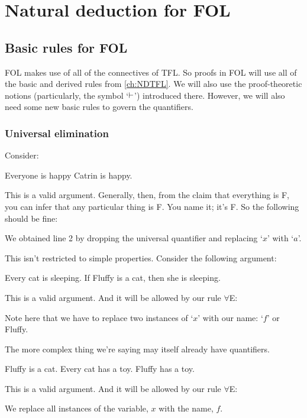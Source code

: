 \part{Natural deduction for FOL}
\label{ch:NDFOL}


\chapter{Basic rules for FOL}\label{sec:BasicFOL}

FOL makes use of all of the connectives of TFL. So proofs in FOL will use all of the basic and derived rules from \cref{ch:NDTFL}. We will also use the proof-theoretic notions (particularly, the symbol `$\vdash$') introduced there. However, we will also need some new basic rules to govern the quantifiers.


\section{Universal elimination}Consider:
\begin{earg}
\prem Everyone is happy
\conc Catrin is happy.
\end{earg} This is a valid argument. Generally, then, from the claim that everything is F, you can infer that any particular thing is F. You name it; it's F. So the following should be fine:
\begin{fitchproof}
	 
\end{fitchproof}
We obtained line 2 by dropping the universal quantifier and replacing `$x$' with `$a$'.

This isn't restricted to simple properties. Consider the following argument:
\begin{earg}
\prem Every cat is sleeping.
\conc If Fluffy is a cat, then she is sleeping.
\end{earg}
This is a valid argument. And it will be allowed by our rule $\forall$E:
\begin{fitchproof}
	 
\end{fitchproof}
Note here that we have to replace two instances of `$x$' with our name: `$f$' or Fluffy. 

The more complex thing we're saying may itself already have quantifiers. 
\begin{earg}
	\prem Fluffy is a cat.
		\prem Every cat has a toy.
	\conc Fluffy has a toy.
\end{earg}
This is a valid argument. And it will be allowed by our rule $\forall$E:
\begin{fitchproof}
	 
\end{fitchproof}
We replace all instances of the variable, $x$ with the name, $f$. 

